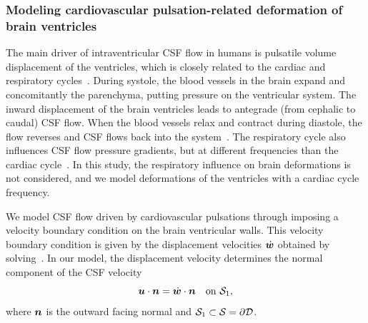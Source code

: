 \documentclass{template}
\begin{document}
\subsubsection{Modeling cardiovascular pulsation-related deformation of brain ventricles}
\label{subsubsec:deformation}
The main driver of intraventricular CSF flow in humans is pulsatile volume displacement
of the ventricles, which is closely related to the cardiac and respiratory cycles~\cite{wagshul2011pulsating,
Vinje2019RespiratoryMeasurements, sweetman2011cerebrospinal, baledent2001cerebrospinal, Neumaier2025}. 
During systole, the blood vessels in the brain expand and concomitantly
the parenchyma, putting pressure on the ventricular system. The inward displacement
of the brain ventricles leads to antegrade (from cephalic to caudal) CSF flow.
When the blood vessels relax and contract during diastole, the flow reverses and
CSF flows back into the system~\cite{sweetman2011cerebrospinal, greitz1992pulsatile}.
The respiratory cycle also influences CSF flow pressure 
gradients, but at different frequencies
than the cardiac cycle~\cite{Vinje2019RespiratoryMeasurements}.
In this study, the respiratory influence on brain deformations is not considered,
and we model deformations of the ventricles with a cardiac cycle frequency.

We model CSF flow driven by cardiovascular pulsations
through imposing a velocity boundary condition on the
brain ventricular walls. This velocity boundary condition
is given by the displacement velocities $\dot{\bm{w}}$ obtained 
by solving~.
In our model, the displacement velocity determines the normal component
of the CSF velocity
\begin{equation}
    \bm{u}\cdot\bm{n} = \dot{\bm{w}}\cdot\bm{n} \quad\text{on }\mathcal{S}_1,
\end{equation}
where $\bm{n}$ is the outward facing normal and 
$\mathcal{S}_1\subset\mathcal{S} = \partial\mathcal{D}$.
\end{document}
